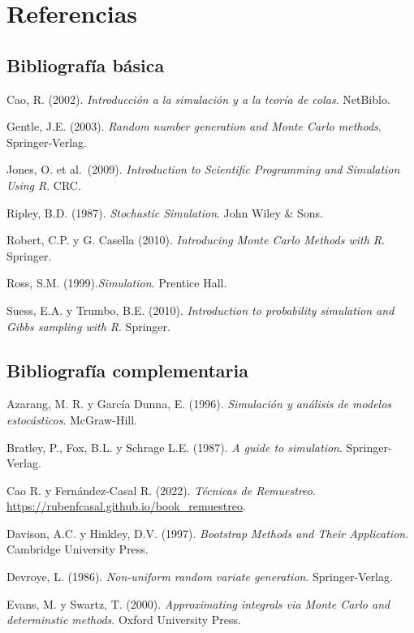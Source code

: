 \documentclass[
  spanish,
  10pt,
]{book}
\theoremstyle{break}
\theoremstyle{nonumberplain}
\begin{document}
\chapter*{Referencias}\label{referencias}

\section*{Bibliografía básica}\label{bibliografuxeda-buxe1sica}

Cao, R. (2002). \emph{Introducción a la simulación y a la teoría de colas}. NetBiblo.

Gentle, J.E. (2003). \emph{Random number generation and Monte Carlo methods}. Springer‐Verlag.

Jones, O. et al.~(2009). \emph{Introduction to Scientific Programming and Simulation Using R}. CRC.

Ripley, B.D. (1987). \emph{Stochastic Simulation}. John Wiley \& Sons.

Robert, C.P. y G. Casella (2010). \emph{Introducing Monte Carlo Methods with R}. Springer.

Ross, S.M. (1999).\emph{Simulation}. Prentice Hall.

Suess, E.A. y Trumbo, B.E. (2010). \emph{Introduction to probability simulation and Gibbs sampling with R}. Springer.

\section*{Bibliografía complementaria}\label{bibliografuxeda-complementaria}

Azarang, M. R. y García Dunna, E. (1996). \emph{Simulación y análisis de modelos estocásticos}. McGraw-Hill.

Bratley, P., Fox, B.L. y Schrage L.E. (1987). \emph{A guide to simulation}. Springer-Verlag.

Cao R. y Fernández-Casal R. (2022). \emph{Técnicas de Remuestreo}. \url{https://rubenfcasal.github.io/book_remuestreo}.

Davison, A.C. y Hinkley, D.V. (1997). \emph{Bootstrap Methods and Their Application}. Cambridge University Press.

Devroye, L. (1986). \emph{Non-uniform random variate generation}. Springer-Verlag.

Evans, M. y Swartz, T. (2000). \emph{Approximating integrals via Monte Carlo and determinstic methods}. Oxford University Press.
\end{document}
